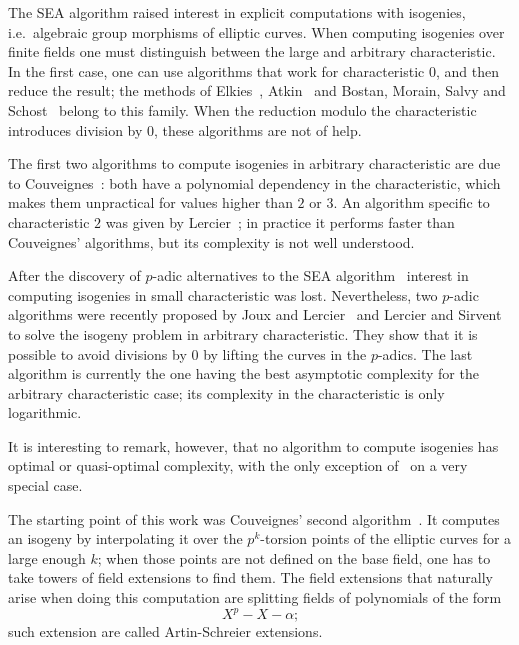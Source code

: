 The SEA algorithm raised interest in explicit computations with
isogenies, i.e.\ algebraic group morphisms of elliptic curves. When
computing isogenies over finite fields one must distinguish between
the large and arbitrary characteristic. In the first case, one can use
algorithms that work for characteristic $0$, and then reduce the
result; the methods of Elkies~\cite{elkies98,morain95},
Atkin~\cite{schoof95} and Bostan, Morain, Salvy and
Schost~\cite{bostan+morain+salvy+schost08} belong to this family. When
the reduction modulo the characteristic introduces division by $0$,
these algorithms are not of help.

The first two algorithms to compute isogenies in arbitrary
characteristic are due to Couveignes~\cite{couveignes94,couveignes96}:
both have a polynomial dependency in the characteristic, which makes
them unpractical for values higher than $2$ or $3$. An algorithm
specific to characteristic $2$ was given by Lercier~\cite{lercier96};
in practice it performs faster than Couveignes' algorithms, but its
complexity is not well understood. 

After the discovery of $p$-adic alternatives to the SEA
algorithm~\cite{satoh00,fouquet+gaudry+harley00} interest in computing
isogenies in small characteristic was lost.  Nevertheless, two
$p$-adic algorithms were recently proposed by Joux and
Lercier~\cite{joux+lercier06} and Lercier and
Sirvent~\cite{lercier+sirvent08} to solve the isogeny problem in
arbitrary characteristic. They show that it is possible to avoid
divisions by $0$ by lifting the curves in the $p$-adics. The last
algorithm is currently the one having the best asymptotic complexity
for the arbitrary characteristic case; its complexity in the
characteristic is only logarithmic.

It is interesting to remark, however, that no algorithm to compute
isogenies has optimal or quasi-optimal complexity, with the only
exception of~\cite{bostan+morain+salvy+schost08} on a very special
case. 

The starting point of this work was Couveignes' second
algorithm~\cite{couveignes96}. It computes an isogeny by interpolating
it over the $p^k$-torsion points of the elliptic curves for a large
enough $k$; when those points are not defined on the base field, one
has to take towers of field extensions to find them. The field
extensions that naturally arise when doing this computation are
splitting fields of polynomials of the form
\[X^p - X -\alpha\text{;}\] such extension are called Artin-Schreier
extensions. 


